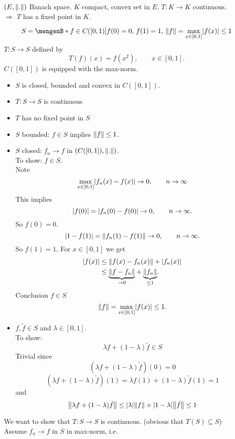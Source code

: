 \begin{theorem}
	$(E, \norm{.})$ Banach space. $K$ compact, convex set in $E$. $T: K \to K$ continuous. \\
	$\Rightarrow $ $T$ has a fixed point in $K$.
\end{theorem}
\begin{beispiel}
	\[
		S = \set[f \in C([0,1])]{f(0) = 0,\, f(1)=1,\, \norm{f} = \max\limits_{x \in [0,1]} \abs{f(x)} \leq 1}
	\]
	$T: S \to S$ defined by
	\[
		T(f)(x) = f(x^2), \qquad x \in [0,1].
	\]
	$C([0,1])$ is equipped with the max-norm. \\
	\begin{itemize}
		\item $S$ is closed, bounded and convex in $C([0,1])$.
		\item $T: S \to S$ is continuous
		\item $T$ has no fixed point in $S$
	\end{itemize}
	\begin{itemize}
		\item 
	$S$ bounded: $f \in S$ implies $\norm{f}\leq 1$. 
	\item $S$ closed: $f_n \to f$ in $(C([0,1]),\norm{.})$. \\
	To show: $f \in S$. \\
	Note \[
		\max_{x \in [0,1]}\lvert f_n(x)-f(x)\rvert \to 0, \qquad n \to \infty
	\]
	This implies
	\[
		\lvert f(0)\rvert = \lvert f_n(0)-f(0)\rvert \to 0, \qquad n \to \infty.
	\]
	So $f(0)=0$.
	\[
		\abs{1-f(1)} = \norm{f_n(1)-f(1)} \to 0, \qquad n \to \infty.
	\]
	So $f(1)=1$. For $x \in [0,1]$ we get
	\begin{align*}
		\abs{f(x)} &\leq \norm{f(x)-f_n(x)} + \abs{f_n(x)} \\
		&\leq \underset{\to 0}{\underbrace{\norm{f-f_n}}} + \underset{\leq 1}{\underbrace{\norm{f_n}}}. 
	\end{align*}
	Conclusion $f \in S$
	\[
		\norm{f} = \max_{x \in [0,1]}\abs{f(x)} \leq 1.
	\]
	\item $f,\tilde f \in S$ and $\lambda \in [0,1]$. \\
	To show: 
	\[
		\lambda f + (1- \lambda) \tilde f \in S
	\]
	Trivial since
	\[
		(\lambda f + (1-\lambda) \tilde f)(0) = 0 
	\]
	\[
		(\lambda f + (1- \lambda) \tilde f)(1) = \lambda f(1)+ (1- \lambda)\tilde f(1)= 1
	\]
	and	
	\[
		\norm{\lambda f + (1-\lambda) \tilde f} \leq \abs{\lambda} \norm{f} + \abs{1- \lambda} \norm{ \tilde f} \leq 1
	\]
	\end{itemize}
	We want to show that $T: S \to S$ is continuous. (obvious that $T(S) \subseteq S$)\\ Assume $f_n \to f$ in $S$ in max-norm, i.e.

\end{beispiel}
